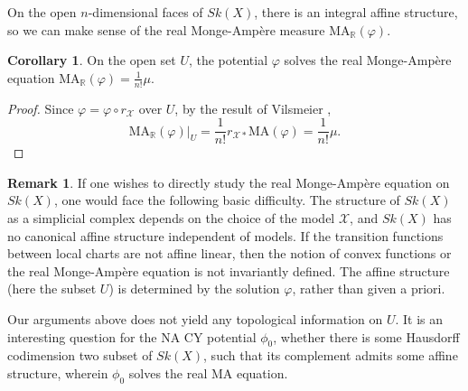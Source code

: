 \documentclass[a4paper]{article}
\theoremstyle{definition}
\newtheorem{cor}[thm]{Corollary}
\newtheorem{rmk}[thm]{Remark}
\newcommand{\R}{\mathbb{R}}
\begin{document}
	
	
	
	
	On the open $n$-dimensional faces of $Sk(X)$, there is an integral affine structure, so we can make sense of the real Monge-Amp\`ere measure $\text{MA}_\R(\varphi)$. 
	
	
	
	\begin{cor}
	On the open set $U$, the potential $\varphi$ solves the real Monge-Amp\`ere equation
$
	\text{MA}_\R(\varphi) =   \frac{1}{n!}\mu. 
$
	\end{cor}
	
	\begin{proof}
	Since $\varphi=\varphi\circ r_{\mathcal{X}}$ over $U$, by the result of Vilsmeier \cite{Vilsmeier},
	\[
	\text{MA}_\R(\varphi) |_U=  \frac{1}{n!}	r_{\mathcal{X}* } \text{MA}( \varphi )= \frac{1}{n!}\mu. 
	\]
	\end{proof}
	
	
	

	
	
	
	\begin{rmk}
If one wishes to directly study the real Monge-Amp\`ere equation on $Sk(X)$, one would face the following basic difficulty. The structure of $Sk(X)$ as a simplicial complex depends on the choice of the model $\mathcal{X}$, and $Sk(X)$ has no canonical affine structure independent of models. 
If the transition functions between local charts are not affine linear, then the notion of convex functions or the real Monge-Amp\`ere equation is not invariantly defined. The affine structure (here the subset $U$) is determined by the solution $\varphi$, rather than given a priori. 


Our arguments above does not yield any topological information on $U$. It is an interesting question for the NA CY potential $\phi_0$, whether there is some Hausdorff codimension two subset of $Sk(X)$, such that its complement admits some affine structure, wherein $\phi_0$ solves the real MA equation.
	\end{rmk}
	
	
	
	
	
	
	
	
\end{document}

